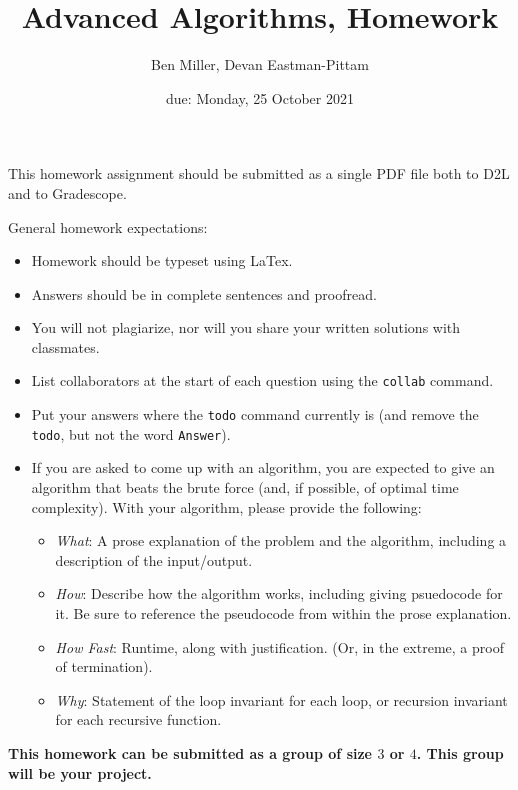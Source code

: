 \documentclass{article}
\title{Advanced Algorithms, Homework \hwnum}
\author{Ben Miller, Devan Eastman-Pittam}
\date{due: Monday, 25 October 2021}
\begin{document}
\maketitle

This homework assignment should be
submitted as a single PDF file both to D2L and to Gradescope.

General homework expectations:
\begin{itemize}
    \item Homework should be typeset using LaTex.
    \item Answers should be in complete sentences and proofread.
    \item You will not plagiarize, nor will you share your written solutions
        with classmates.
    \item List collaborators at the start of each question using the
        \texttt{collab} command.
    \item Put your answers where the \texttt{todo} command currently is (and
        remove the \texttt{todo}, but not the word \texttt{Answer}).
    \item If you are asked to come up with an algorithm, you are
        expected to give an algorithm that beats the brute force (and, if possible, of
        optimal time complexity). With your algorithm, please provide the following:
        \begin{itemize}
            \item \emph{What}: A prose explanation of the problem and the algorithm,
                including a description of the input/output.
            \item \emph{How}: Describe how the algorithm works, including giving
                psuedocode for it.  Be sure to reference the pseudocode
                from within the prose explanation.
            \item \emph{How Fast}: Runtime, along with justification.  (Or, in the
                extreme, a proof of termination).
            \item \emph{Why}: Statement of the loop invariant for each loop, or
                recursion invariant for each recursive function.
        \end{itemize}
\end{itemize}

{\bf
This homework can be submitted as a group of size $3$ or $4$.  This group will
be your project.
}

\collab{\todo{}}
\end{document}

